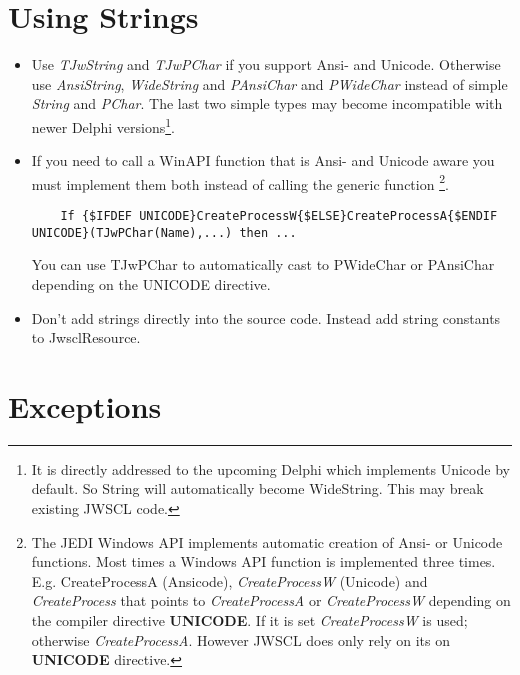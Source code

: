 \documentclass[a4paper,oneside,10pt]{article}
\begin{document}
\section{Using Strings}
\begin{itemize}
	\item Use \textit{TJwString} and \textit{TJwPChar} if you support Ansi- and Unicode. Otherwise use \textit{AnsiString}, \textit{WideString} and \textit{PAnsiChar} and \textit{PWideChar} instead of simple \textit{String} and \textit{PChar}. The last two simple types may become incompatible with newer Delphi versions\footnote{It is directly addressed to the upcoming Delphi which implements Unicode by default. So String will automatically become WideString. This may break existing JWSCL code.}.
	\item If you need to call a WinAPI function that is Ansi- and Unicode aware you must implement them both instead of calling the generic function \footnote{The JEDI Windows API implements automatic creation of Ansi- or Unicode functions. Most times a Windows API function is implemented three times. E.g. CreateProcessA (Ansicode), \textit{CreateProcessW} (Unicode) and \textit{CreateProcess} that points to \textit{CreateProcessA} or \textit{CreateProcessW} depending on the compiler directive \textbf{UNICODE}. If it is set \textit{CreateProcessW} is used; otherwise \textit{CreateProcessA}. However JWSCL does only rely on its on \textbf{UNICODE} directive.}.  
  \begin{lstlisting}
    If {$IFDEF UNICODE}CreateProcessW{$ELSE}CreateProcessA{$ENDIF UNICODE}(TJwPChar(Name),...) then ...
  \end{lstlisting} 
  You can use TJwPChar to automatically cast to PWideChar or PAnsiChar depending on the UNICODE directive.
	\item Don't add strings directly into the source code. Instead add string constants to JwsclResource. 	
\end{itemize}

\section{Exceptions}
\end{document}
